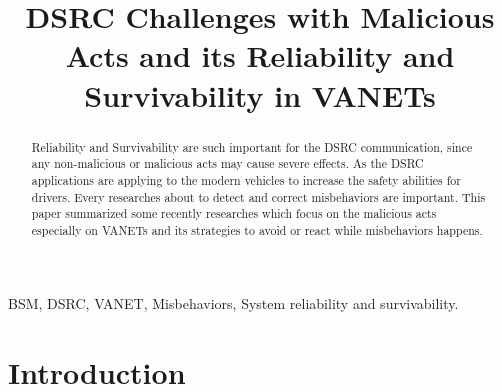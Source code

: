 \documentclass[conference]{IEEEtran}
\begin{document}
%
\title{DSRC Challenges with Malicious Acts and its Reliability and Survivability in VANETs}


\author{
}






\maketitle

\begin{abstract}
Reliability and Survivability are such important for the DSRC communication, since any non-malicious or malicious acts may cause severe effects. As the DSRC applications are applying to the modern vehicles to increase the safety abilities for drivers. Every researches about to detect and correct misbehaviors are important. This paper summarized some recently researches which focus on the malicious acts especially on VANETs and its strategies to avoid or react while misbehaviors happens.

\end{abstract}

\begin{IEEEkeywords}
BSM, DSRC, VANET, Misbehaviors, System reliability and survivability.
\end{IEEEkeywords}




%
\IEEEpeerreviewmaketitle



\section{Introduction}
\end{document}
